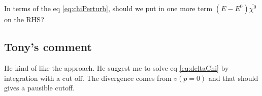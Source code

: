 In terms of the eq \eqref{eq:chiPerturb}, should we put in one more term $(E-E^0)\overline{\chi^0}$ on the RHS? 
\subsection{Tony's comment}
He kind of like the approach.  He suggest me to solve eq \eqref{eq:deltaChi} by integration with a cut off.  The divergence comes from $v(p=0)$ and that should gives a pausible cutoff.  
